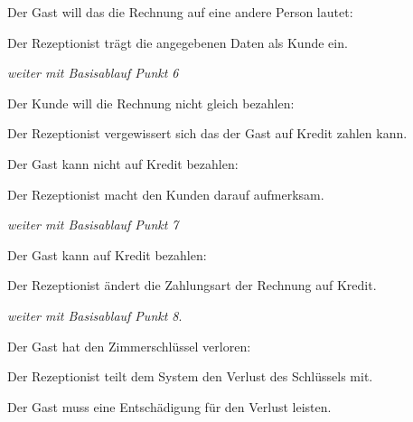 \begin{longenum}
\begin{longenum}
	\item Der \Gls{Gast} will das die Rechnung auf eine andere Person lautet:
		\begin{longenum}
			\item Der \Gls{Rezeptionist} trägt die angegebenen Daten als \Gls{Kunde} ein.
			\item \emph{weiter mit Basisablauf Punkt 6}
		\end{longenum}
	\end{longenum}
	\item
	\item
	\begin{longenum}
		\item Der \Gls{Kunde} will die Rechnung nicht gleich bezahlen:
		\begin{longenum}
			\item Der \Gls{Rezeptionist} vergewissert sich das der \Gls{Gast} auf Kredit
			zahlen kann.
			\begin{longenum}
				\item Der \Gls{Gast} kann nicht auf Kredit bezahlen:
				\begin{longenum}
					\item Der \Gls{Rezeptionist} macht den Kunden darauf aufmerksam.
					\item \emph{weiter mit Basisablauf Punkt 7}
				\end{longenum}
				\item Der \Gls{Gast} kann auf Kredit bezahlen:
				\begin{longenum}
					\item Der \Gls{Rezeptionist} ändert die Zahlungsart der \Gls{Rechnung} auf
					Kredit.
					\item \emph{weiter mit Basisablauf Punkt 8}.
				\end{longenum}
			\end{longenum}
		\end{longenum}
	\end{longenum}
	\item
	\item
	\begin{longenum}
		\item Der \Gls{Gast} hat den Zimmerschlüssel verloren:
		\begin{longenum}
			\item Der \Gls{Rezeptionist} teilt dem System den Verlust des Schlüssels mit.
			\item Der \Gls{Gast} muss eine Entschädigung für den Verlust leisten.
		\end{longenum}
	\end{longenum}
\end{longenum}

